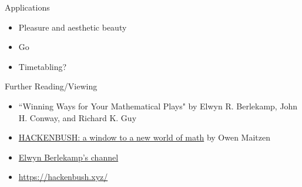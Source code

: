 \documentclass{beamer}
\begin{document}
\begin{frame}{Applications}
    \begin{itemize}
        \setlength{\itemsep}{20pt}
        \item Pleasure and aesthetic beauty
        \item Go
        \item Timetabling?
    \end{itemize}
\end{frame}

\begin{frame}{Further Reading/Viewing}
    \begin{itemize}
        \setlength{\itemsep}{20pt}
        \item ``Winning Ways for Your Mathematical Plays" by  Elwyn R. Berlekamp, John H. Conway, and Richard K. Guy
        \item \href{https://www.youtube.com/watch?v=ZYj4NkeGPdM}{HACKENBUSH: a window to a new world of math} by Owen Maitzen
        \item \href{https://www.youtube.com/channel/UCF2fIXCrN_aOfluJ-8zEbeA}{Elwyn Berlekamp's channel}
        \item \url{https://hackenbush.xyz/}
    \end{itemize}
\end{frame}
\end{document}
